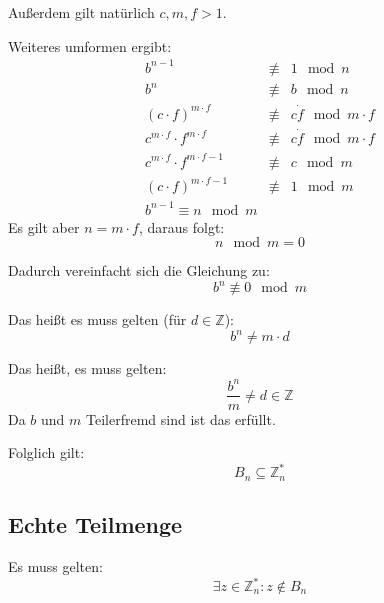 \documentclass[DIN, pagenumber=false, fontsize=11pt, parskip=half]{scrartcl}
\begin{document}
    Außerdem gilt natürlich $c, m, f > 1$.

    Weiteres umformen ergibt:
    \begin{eqnarray}
        b^{n-1} &\not\equiv& 1 \mod n \\
        b^{n} &\not\equiv& b \mod n \\
        {\left(c \cdot f \right)}^{m \cdot f} &\not\equiv& c \dot f \mod m \cdot f \\
        c^{m \cdot f} \cdot f^{m \cdot f} &\not\equiv& c \dot f \mod m \cdot f \\
        c^{m \cdot f} \cdot f^{m \cdot f - 1} &\not\equiv& c \mod m \\
        {\left(c \cdot f\right)}^{m \cdot f -1} &\not\equiv& 1 \mod m \\
        b^{n-1} \equiv n \mod m
    \end{eqnarray}
    Es gilt aber $n = m \cdot f$, daraus folgt:
    \begin{equation}
        n \mod m = 0
    \end{equation}

    Dadurch vereinfacht sich die Gleichung zu:
    \begin{equation}
        b^n \not\equiv 0 \mod m
    \end{equation}

    Das heißt es muss gelten (für $d \in \mathbb{Z}$):
    \begin{equation}
        b^n \neq m \cdot d
    \end{equation}

    Das heißt, es muss gelten:
    \begin{equation}
        \frac{b^n}{m} \neq d \in \mathbb{Z}
    \end{equation}
    Da $b$ und $m$ Teilerfremd sind ist das erfüllt. 

    Folglich gilt:
    \begin{equation}
        B_n \subseteq \mathbb{Z}^*_n
    \end{equation}

    \subsection{Echte Teilmenge}
    Es muss gelten:
    \begin{equation}
        \exists z \in \mathbb{Z}^*_n: z \notin B_n
    \end{equation}
\end{document}
